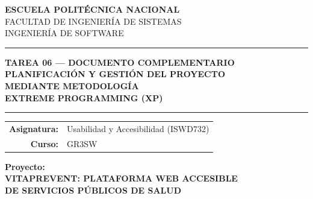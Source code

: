 \documentclass[12pt, a4paper]{article}
\begin{document}

\begin{titlepage}
\centering
\vspace*{0.5cm}


\vspace{0.5cm}
{\LARGE\bfseries\color{navydeep} ESCUELA POLITÉCNICA NACIONAL}\\[4pt]
{\large\color{navydeep} FACULTAD DE INGENIERÍA DE SISTEMAS}\\[2pt]
{\large\color{navydeep} INGENIERÍA DE SOFTWARE}

\vspace{1.0cm}
{\color{violetxp}\rule{0.85\linewidth}{1.5pt}}

\vspace{0.6cm}
{\large\bfseries\color{navydeep} TAREA 06 --- DOCUMENTO COMPLEMENTARIO}\\[6pt]
{\Large\bfseries\color{navydeep}
  PLANIFICACIÓN Y GESTIÓN DEL PROYECTO\\
  MEDIANTE METODOLOGÍA\\[4pt]
  \textcolor{violetxp}{EXTREME PROGRAMMING (XP)}}

\vspace{0.8cm}
{\color{violetxp}\rule{0.85\linewidth}{0.8pt}}

\vspace{0.8cm}
\begin{tabular}{@{}rl@{}}
  \textbf{\color{navydeep}Asignatura:} & Usabilidad y Accesibilidad (ISWD732) \\[4pt]
  \textbf{\color{navydeep}Curso:}      & GR3SW \\[8pt]
\end{tabular}

\vspace{0.4cm}
\begin{center}
{\normalsize\bfseries\color{navydeep} Proyecto:}\\[4pt]
{\large\bfseries\color{royalblue}
  VITAPREVENT: PLATAFORMA WEB ACCESIBLE\\
  DE SERVICIOS PÚBLICOS DE SALUD}
\end{center}


\end{titlepage}
\end{document}
